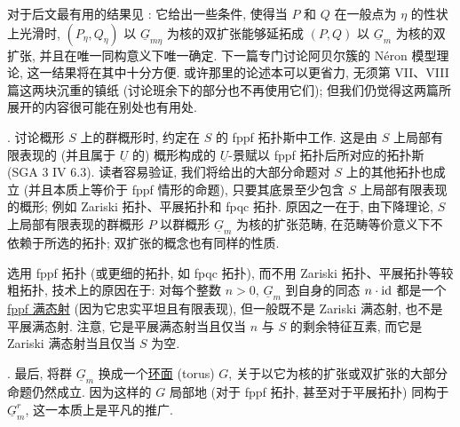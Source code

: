 对于后文最有用的结果见 : 它给出一些条件, 使得当 $P$ 和 $Q$ 在一般点为 $\eta$ 的性状上光滑时, $(P_\eta,Q_\eta)$ 以 $\underline G_{m\eta}$ 为核的双扩张能够延拓成 $(P,Q)$ 以 $\underline G_m$ 为核的双扩张, 并且在唯一同构意义下唯一确定. 下一篇专门讨论阿贝尔簇的 N\'eron 模型理论, 这一结果将在其中十分方便. 或许那里的论述本可以更省力, 无须第 VII、VIII 篇这两块沉重的镇纸 (讨论班余下的部分也不再使用它们); 但我们仍觉得这两篇所展开的内容很可能在别处也有用处.

. 讨论概形 $S$ 上的群概形时, 约定在 $S$ 的 fppf 拓扑斯中工作. 这是由 $S$ 上局部有限表现的 (并且属于 $\underline U$ 的) 概形构成的 $\underline U$-景赋以 fppf 拓扑后所对应的拓扑斯 (SGA 3 IV 6.3). 读者容易验证, 我们将给出的大部分命题对 $S$ 上的其他拓扑也成立 (并且本质上等价于 fppf 情形的命题), 只要其底景至少包含 $S$ 上局部有限表现的概形; 例如 Zariski 拓扑、平展拓扑和 fpqc 拓扑. 原因之一在于, 由下降理论, $S$ 上局部有限表现的群概形 $P$ 以群概形 $\underline G_m$ 为核的扩张范畴, 在范畴等价意义下不依赖于所选的拓扑; 双扩张的概念也有同样的性质.

选用 fppf 拓扑 (或更细的拓扑, 如 fpqc 拓扑), 而不用 Zariski 拓扑、平展拓扑等较粗拓扑, 技术上的原因在于: 对每个整数 $n>0$, $\underline G_m$ 到自身的同态 $n\cdot\mathrm{id}$ 都是一个 \underline{fppf 满态射} (因为它忠实平坦且有限表现), 但一般既不是 Zariski 满态射, 也不是平展满态射. 注意, 它是平展满态射当且仅当 $n$ 与 $S$ 的剩余特征互素, 而它是 Zariski 满态射当且仅当 $S$ 为空.

. 最后, 将群 $\underline G_m$ 换成一个\underline{环面} (torus) $G$, 关于以它为核的扩张或双扩张的大部分命题仍然成立. 因为这样的 $G$ 局部地 (对于 fppf 拓扑, 甚至对于平展拓扑) 同构于 $\underline G_m^r$, 这一本质上是平凡的推广.



